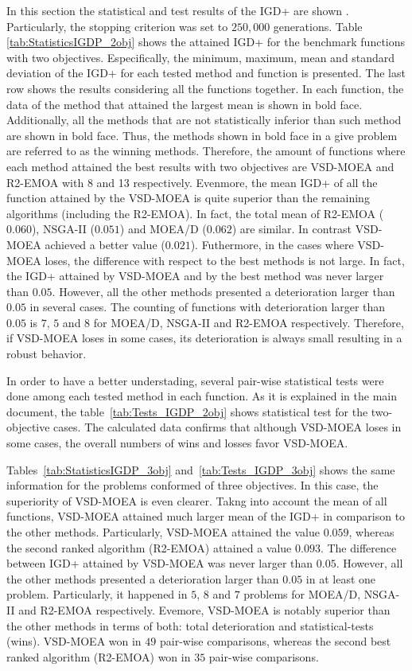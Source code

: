In this section the statistical and test results of the IGD+ are shown \cite{Joel:Inverted_Generational_Distance_Plus}.
%
Particularly, the stopping criterion was set to $250,000$ generations.
%
Table \ref{tab:StatisticsIGDP_2obj} shows the attained IGD+ for the benchmark functions with two objectives.
%
Especifically, the minimum, maximum, mean and standard deviation of the IGD+ for each tested method and function is presented.
%
The last row shows the results considering all the functions together.
%
In each function, the data of the method that attained the largest mean is shown in bold face.
%
Additionally, all the methods that are not statistically inferior than such method are shown in bold face.
%
Thus, the methods shown in bold face in a give problem are referred to as the winning methods.
%
Therefore, the amount of functions where each method attained the best results with two objectives are VSD-MOEA and R2-EMOA with 8 and 13 respectively.
%
Evenmore, the mean IGD+ of all the function attained by the VSD-MOEA is quite superior than the remaining algorithms (including the R2-EMOA).
%
In fact, the total mean of R2-EMOA ($0.060$), NSGA-II ($0.051$) and MOEA/D ($0.062$) are similar.
%
In contrast VSD-MOEA achieved a better value ($0.021$).
%
Futhermore, in the cases where VSD-MOEA loses, the difference with respect to the best methods is not large.
%
In fact, the IGD+ attained by VSD-MOEA and by the best method was never larger than $0.05$.
%
However, all the other methods presented a deterioration larger than $0.05$ in several cases.
%
The counting of functions with deterioration larger than $0.05$ is $7$, $5$ and $8$ for MOEA/D, NSGA-II and R2-EMOA respectively.
%
Therefore, if VSD-MOEA loses in some cases, its deterioration is always small resulting in a robust behavior.

In order to have a better understading, several pair-wise statistical tests were done among each tested method in each function.
%
As it is explained in the main document, the table~\ref{tab:Tests_IGDP_2obj} shows statistical test for the two-objective cases.
%
The calculated data confirms that although VSD-MOEA loses in some cases, the overall numbers of wins and losses favor VSD-MOEA.
%

Tables~\ref{tab:StatisticsIGDP_3obj} and~\ref{tab:Tests_IGDP_3obj} shows the same information for the problems conformed of three objectives.
%
In this case, the superiority of VSD-MOEA is even clearer.
%
Takng into account the mean of all functions, VSD-MOEA attained much larger mean of the IGD+ in comparison to the other methods.
%
Particularly, VSD-MOEA attained the value $0.059$, whereas the second ranked algorithm (R2-EMOA) attained a value $0.093$.
%
The difference between IGD+ attained by VSD-MOEA was never larger than $0.05$.
%
However, all the other methods presented a deterioration larger than $0.05$ in at least one problem.
%
Particularly, it happened in $5$, $8$ and $7$ problems for MOEA/D, NSGA-II and R2-EMOA respectively.
%
Evemore, VSD-MOEA is notably superior than the other methods in terms of both: total deterioration and statistical-tests (wins).
%
VSD-MOEA won in $49$ pair-wise comparisons, whereas the second best ranked algorithm (R2-EMOA) won in $35$ pair-wise comparisons.







